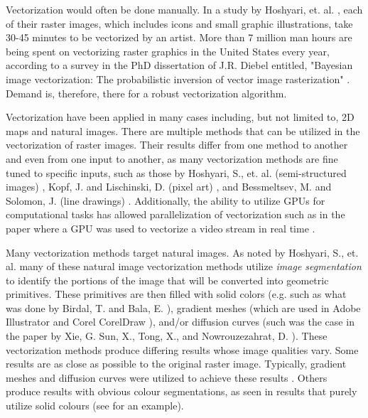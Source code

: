 Vectorization would often be done manually. In a study by Hoshyari, et. al. \cite{hoshyari2018perceptiondriven}, each of their raster images, which includes icons and small graphic illustrations, take 30-45 minutes to be vectorized by an artist. More than 7 million man hours are being spent on vectorizing raster graphics in the United States every year, according to a survey in the PhD dissertation of J.R. Diebel entitled, "Bayesian image vectorization: The probabilistic inversion of vector image rasterization" \cite{effectiveclipartimagevectorization}. Demand is, therefore, there for a robust vectorization algorithm.

Vectorization have been applied in many cases including, but not limited to, 2D maps and natural images. There are multiple methods that can be utilized in the vectorization of raster images. Their results differ from one method to another and even from one input to another, as many vectorization methods are fine tuned to specific inputs, such as those by Hoshyari, S., et. al. (semi-structured images) \cite{hoshyari2018perceptiondriven}, Kopf, J. and Lischinski, D. (pixel art) \cite{depixelizingpixelart}, and Bessmeltsev, M. and Solomon, J. (line drawings) \cite{vectorizationoflinedrawingspolyvector}. Additionally, the ability to utilize GPUs for computational tasks has allowed parallelization of vectorization such as in the paper where a GPU was used to vectorize a video stream in real time \cite{realtimevectorizationgpu}.

Many vectorization methods target natural images. As noted by Hoshyari, S., et. al. many of these natural image vectorization methods utilize \textit{image segmentation} to identify the portions of the image that will be converted into geometric primitives. These primitives are then filled with solid colors (e.g. such as what was done by Birdal, T. and Bala, E. \cite{anovelmethodforvectorization}), gradient meshes (which are used in Adobe Illustrator and Corel CorelDraw \cite{optimizedgradientmeshes}\cite{barendrecht2018locally}), and/or diffusion curves (such was the case in the paper by Xie, G. Sun, X., Tong, X., and Nowrouzezahrat, D. \cite{hierarchicaldiffusioncurves}). These vectorization methods produce differing results whose image qualities vary. Some results are as close as possible to the original raster image. Typically, gradient meshes and diffusion curves were utilized to achieve these results \cite{hierarchicaldiffusioncurves}\cite{optimizedgradientmeshes}\cite{barendrecht2018locally}. Others produce results with obvious colour segmentations, as seen in results that purely utilize solid colours (see \cite{anovelmethodforvectorization} for an example).

